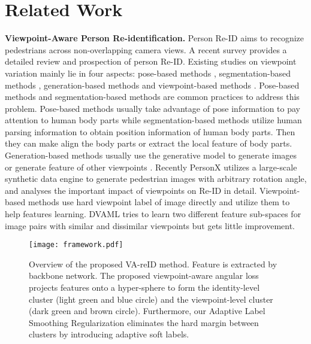 \documentclass[letterpaper]{article} \usepackage{aaai20}  \usepackage{times}  \usepackage{helvet} \usepackage{courier}  \usepackage[hyphens]{url}  \usepackage{graphicx} \usepackage{array}
\begin{document}
\section{Related Work}
\noindent \textbf{Viewpoint-Aware Person Re-identification.} 
Person Re-ID aims to recognize pedestrians across non-overlapping camera views. A recent survey \cite{leng2019survey} provides a detailed review and prospection of person Re-ID. Existing studies on viewpoint variation mainly lie in four aspects: pose-based methods \cite{Su_2017_ICCV,Sarfraz_2018_CVPR}, segmentation-based methods \cite{Kalayeh_2018_CVPR}, generation-based methods \cite{Zhou_2018_CVPR,Qian_2018_ECCV,Sun_2019_CVPR} and viewpoint-based methods \cite{ijcai2018-86}. Pose-based methods and segmentation-based methods are common practices to address this problem.  Pose-based methods usually take advantage of pose information to pay attention to human body parts while segmentation-based methods utilize human parsing information to obtain position information of human body parts. Then they can make align the body parts or extract the local feature of body parts. Generation-based methods usually use the generative model to generate images \cite{Qian_2018_ECCV} or generate feature of other viewpoints \cite{Zhou_2018_CVPR}. Recently PersonX \cite{Sun_2019_CVPR} utilizes a large-scale synthetic data engine to generate pedestrian images with arbitrary rotation angle, and analyses the important impact of viewpoints on Re-ID in detail. Viewpoint-based methods use hard viewpoint label of image directly and utilize them to help features learning. DVAML \cite{ijcai2018-86} tries to learn two different feature sub-spaces for image pairs with similar and dissimilar viewpoints but gets little improvement. 


\begin{figure*}[t]
\centering
\texttt{[image: framework.pdf]} \caption{Overview of the proposed VA-reID method. Feature  is extracted by backbone network. 
The proposed viewpoint-aware angular loss projects features onto a hyper-sphere to form the identity-level cluster (light green and blue circle) and the viewpoint-level cluster (dark green and brown circle). Furthermore, our Adaptive Label Smoothing Regularization eliminates the hard margin between clusters by introducing adaptive soft labels. }
\label{fig:framework}
\end{figure*}
\end{document}

